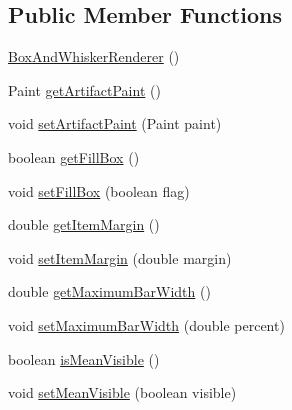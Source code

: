 \subsection*{Public Member Functions}
\begin{DoxyCompactItemize}
\item 
\mbox{\hyperlink{classorg_1_1jfree_1_1chart_1_1renderer_1_1category_1_1_box_and_whisker_renderer_aa0fefbd4a1036ac80b0def6bb8d52c1d}{Box\+And\+Whisker\+Renderer}} ()
\item 
Paint \mbox{\hyperlink{classorg_1_1jfree_1_1chart_1_1renderer_1_1category_1_1_box_and_whisker_renderer_a1cc8be64ea3fb3a58a510028438d0e22}{get\+Artifact\+Paint}} ()
\item 
void \mbox{\hyperlink{classorg_1_1jfree_1_1chart_1_1renderer_1_1category_1_1_box_and_whisker_renderer_a7107b64291c63161afdeb8323f0160d6}{set\+Artifact\+Paint}} (Paint paint)
\item 
boolean \mbox{\hyperlink{classorg_1_1jfree_1_1chart_1_1renderer_1_1category_1_1_box_and_whisker_renderer_ad5dedb8a55b65ce3cfbc95ed19fc05d7}{get\+Fill\+Box}} ()
\item 
void \mbox{\hyperlink{classorg_1_1jfree_1_1chart_1_1renderer_1_1category_1_1_box_and_whisker_renderer_ae5b3547e344c41775f7029a29807a36b}{set\+Fill\+Box}} (boolean flag)
\item 
double \mbox{\hyperlink{classorg_1_1jfree_1_1chart_1_1renderer_1_1category_1_1_box_and_whisker_renderer_aa684d8b009be8e363506f9524df5acc5}{get\+Item\+Margin}} ()
\item 
void \mbox{\hyperlink{classorg_1_1jfree_1_1chart_1_1renderer_1_1category_1_1_box_and_whisker_renderer_a24d502fe9b73213ec22790d5c52c86b7}{set\+Item\+Margin}} (double margin)
\item 
double \mbox{\hyperlink{classorg_1_1jfree_1_1chart_1_1renderer_1_1category_1_1_box_and_whisker_renderer_a75dac37a934f1d6fbc517d54b3e6f2ec}{get\+Maximum\+Bar\+Width}} ()
\item 
void \mbox{\hyperlink{classorg_1_1jfree_1_1chart_1_1renderer_1_1category_1_1_box_and_whisker_renderer_a59f58fc19ee8aba6604cc483f540bdca}{set\+Maximum\+Bar\+Width}} (double percent)
\item 
boolean \mbox{\hyperlink{classorg_1_1jfree_1_1chart_1_1renderer_1_1category_1_1_box_and_whisker_renderer_a28fffbc9213cc6fc45f5dc6ad899685b}{is\+Mean\+Visible}} ()
\item 
void \mbox{\hyperlink{classorg_1_1jfree_1_1chart_1_1renderer_1_1category_1_1_box_and_whisker_renderer_a400684ac91972f5c31f81113c04099cf}{set\+Mean\+Visible}} (boolean visible)

\end{DoxyCompactItemize}
